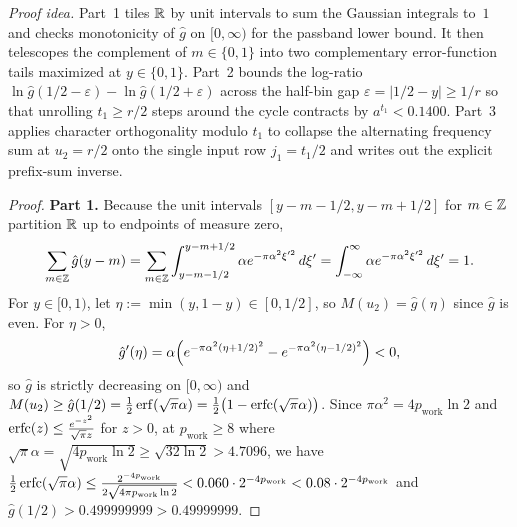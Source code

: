 \noindent\emph{Proof idea.} Part~1 tiles $\mathbb{R}$ by unit intervals to sum the Gaussian integrals to~$1$ and checks monotonicity of $\hat{g}$ on $[0, \infty)$ for the passband lower bound. It then telescopes the complement of $m \in \{0, 1\}$ into two complementary error-function tails maximized at $y \in \{0, 1\}$. Part~2 bounds the log-ratio $\ln\hat{g}(1/2 - \varepsilon) - \ln\hat{g}(1/2 + \varepsilon)$ across the half-bin gap $\varepsilon = |1/2 - y| \ge 1/r$ so that unrolling $t_1 \ge r/2$ steps around the cycle contracts by $a^{t_1} < 0.1400$. Part~3 applies character orthogonality modulo $t_1$ to collapse the alternating frequency sum at $u_2 = r/2$ onto the single input row $j_1 = t_1 / 2$ and writes out the explicit prefix-sum inverse.

\begin{proof}
\textbf{Part 1.} Because the unit intervals $[y - m - 1/2, y - m + 1/2]$ for $m \in \mathbb{Z}$ partition $\mathbb{R}$ up to endpoints of measure zero,
\[
  \sum_{m \in \mathbb{Z}} \hat{g}(y - m) = \sum_{m \in \mathbb{Z}} \int_{y - m - 1/2}^{y - m + 1/2} \alpha e^{-\pi\alpha^2 \xi'^2}\,d\xi' = \int_{-\infty}^\infty \alpha e^{-\pi\alpha^2\xi'^2}\,d\xi' = 1.
\]
For $y \in [0, 1)$, let $\eta := \min(y, 1 - y) \in [0, 1/2]$, so $M(u_2) = \hat{g}(\eta)$ since $\hat{g}$ is even. For $\eta > 0$,
\[
  \hat{g}'(\eta) = \alpha\Bigl(e^{-\pi\alpha^2(\eta + 1/2)^2} - e^{-\pi\alpha^2(\eta - 1/2)^2}\Bigr) < 0,
\]
so $\hat{g}$ is strictly decreasing on $[0, \infty)$ and $M(u_2) \ge \hat{g}(1/2) = \frac{1}{2}\operatorname{erf}(\sqrt{\pi}\alpha) = \frac{1}{2}\bigl(1 - \operatorname{erfc}(\sqrt{\pi}\alpha)\bigr)$. Since $\pi\alpha^2 = 4 p_{\mathrm{work}} \ln 2$ and $\operatorname{erfc}(z) \le \frac{e^{-z^2}}{\sqrt{\pi} z}$ for $z > 0$, at $p_{\mathrm{work}} \ge 8$ where $\sqrt{\pi}\alpha = \sqrt{4 p_{\mathrm{work}} \ln 2} \ge \sqrt{32 \ln 2} > 4.7096$, we have $\frac{1}{2}\operatorname{erfc}(\sqrt{\pi}\alpha) \le \frac{2^{-4p_{\mathrm{work}}}}{2\sqrt{4\pi p_{\mathrm{work}} \ln 2}} < 0.060 \cdot 2^{-4p_{\mathrm{work}}} < 0.08 \cdot 2^{-4p_{\mathrm{work}}}$ and $\hat{g}(1/2) > 0.499999999 > 0.49999999$.


\end{proof}
